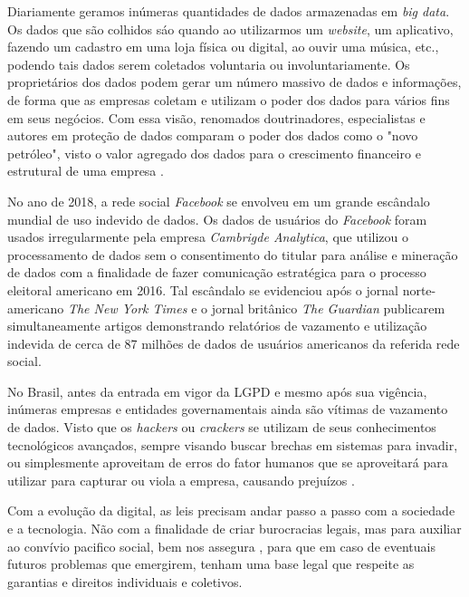 \documentclass[
	12pt,				%
	openright,			%
	oneside,			%
	a4paper,			%
	english,			%
	french,				%
	spanish,			%
	brazil,				%
	]{abntex2}
\begin{document}
Diariamente geramos inúmeras quantidades de dados armazenadas em \textit{big data}. Os dados que são colhidos sáo quando ao utilizarmos um \textit{website}, um aplicativo, fazendo um cadastro em uma loja física ou digital, ao ouvir uma música, etc., podendo tais dados serem coletados voluntaria ou involuntariamente. Os proprietários dos dados podem gerar um número massivo de dados e informações, de forma que as empresas coletam e utilizam o poder dos dados para vários fins em seus negócios. Com essa visão, renomados doutrinadores, especialistas e autores em proteção de dados comparam o poder dos dados como o "novo petróleo", visto o valor agregado dos dados para o crescimento financeiro e estrutural de uma empresa \cite{02-01-Jobim2021}. 

No ano de 2018, a rede social \textit{Facebook} se envolveu em um grande escândalo mundial de uso indevido de dados. Os  dados de usuários do \textit{Facebook}  foram usados irregularmente pela empresa \textit{Cambrigde Analytica}, que utilizou o processamento de dados sem o consentimento do titular para análise e mineração de dados com a finalidade de fazer comunicação estratégica para o processo eleitoral americano em 2016.
Tal escândalo se evidenciou após o jornal norte-americano \textit{The New York Times} \cite{01-03-Rosenberg2018} e o jornal britânico \textit{The Guardian} \cite{01-04-Graham} publicarem simultaneamente artigos demonstrando relatórios de vazamento e utilização indevida de cerca de 87 milhões de dados de usuários americanos da referida rede social. 

No Brasil, antes da entrada em vigor da LGPD e mesmo após sua vigência, inúmeras empresas e entidades governamentais ainda são vítimas de vazamento de dados. Visto que os \textit{hackers} ou \textit{crackers} se utilizam de seus conhecimentos tecnológicos avançados, sempre visando buscar brechas em sistemas para invadir, ou simplesmente aproveitam de erros do fator humanos que se aproveitará para utilizar para capturar ou viola a empresa, causando prejuízos \cite{02-01-Almeida2020}.

Com a evolução da digital, as leis precisam andar passo a passo com a sociedade e a tecnologia. Não com a finalidade de criar burocracias legais, mas para auxiliar ao convívio pacifico social, bem nos assegura , para que em caso de eventuais futuros problemas que emergirem, tenham uma base legal que respeite as garantias e direitos individuais e coletivos. 
\end{document}
